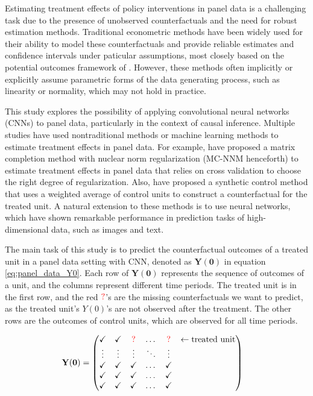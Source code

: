 
Estimating treatment effects of policy interventions in panel data is a challenging task due to the presence of unobserved counterfactuals and the need for robust estimation methods.
Traditional econometric methods have been widely used for their ability to model these counterfactuals and provide reliable estimates and confidence intervals under paticular assumptions, most closely based on the potential outcomes framework of \textcite{rubin1974estimating}.
However, these methods often implicitly or explicitly assume parametric forms of the data generating process, such as linearity or normality, which may not hold in practice.

This study explores the possibility of applying convolutional neural networks (CNNs) to panel data, particularly in the context of causal inference.
Multiple studies have used nontraditional methods 
or machine learning methods to estimate treatment effects in panel data.
For example, \textcite{athey2021matrix} have proposed a matrix completion method with nuclear norm regularization (MC-NNM henceforth) to estimate treatment effects in panel data that relies on cross validation to choose the
right degree of regularization.
Also, \textcite{abadie2010synthetic} have proposed a synthetic control method that uses 
a weighted average of control units to construct a counterfactual for the treated unit.
A natural extension to these methods is to use neural networks, which have shown remarkable performance in prediction tasks of high-dimensional data, such as images and text.


The main task of this study is to predict the counterfactual outcomes of a treated unit in a panel data setting with CNN, denoted 
as $\mathbf{Y(0)}$ in equation \eqref{eq:panel_data_Y0}.
Each row of $\mathbf{Y(0)}$ represents the sequence of outcomes of a unit, and the columns represent different time periods.
The treated unit is in the first row, and the red ${\color{red} ?}$'s are the missing counterfactuals we want to predict, as the treated unit's $Y(0)$'s are not observed after the treatment.
The other rows are the outcomes of control units, which are observed for all time periods.

\begin{align}
    	\mathbf{Y(0)}&=\begin{pmatrix}
		\checkmark  & \checkmark & {\color{red} ?}   & \dots & {\color{red} ?}  & \leftarrow{\text{treated unit}}\\
		\vdots   &  \vdots & \vdots &\ddots &\vdots& \\
        \checkmark & \checkmark & \checkmark  & \dots & \checkmark& \\
		\checkmark  & \checkmark & \checkmark   & \dots & \checkmark & \\
		\checkmark & \checkmark & \checkmark   & \dots & \checkmark & 
		\end{pmatrix} 
        \label{eq:panel_data_Y0}
\end{align}


